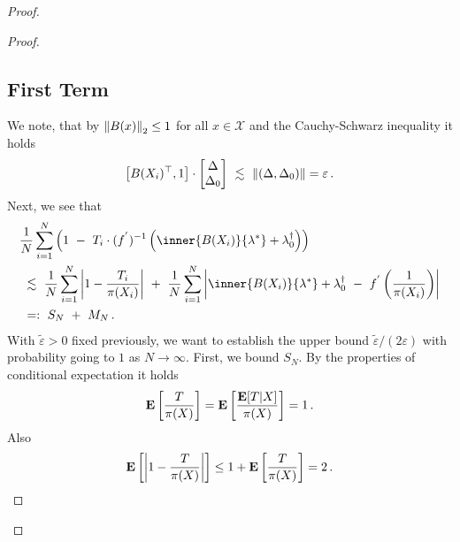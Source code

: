 \begin{proof}
\begin{proof}
\subsection*{First Term}
We note, that by $\left\lVert B(x)\right\rVert_2\le 1$ for all $x\in\mathcal{X}$ and the Cauchy-Schwarz inequality
it holds
\begin{gather}
  \label{c:first:0}
      \left[ 
       B(X_i)^\top,
       1
     \right]
     \cdot
     \begin{bmatrix}
       \Delta\\
       \Delta_0
     \end{bmatrix}
     \ 
     \lesssim
     \ 
     \norm{(\Delta,\Delta_0)}
     =\varepsilon
     \,.
\end{gather}
Next, we see that
\begin{align}
  \label{c:first:1}
  \begin{split}
  &
     \frac{1}{N}
     \sum_{i=1}^{N} 
     \left( 
       1
       \ 
       -
       \ 
     T_i
     \cdot
     (f^{'})^{-1}
     \left( 
       \inner
       {B(X_i)}
       {\lambda^*}
       +
      \lambda^\dagger_0
     \right)
     \right)
     \\
     &
     \ 
     \lesssim
     \ 
     \frac{1}{N}
     \sum_{i=1}^{N} 
     \left|
     1
     -
     \frac{T_i}{\pi(X_i)}
     \right|
      \ 
     +
      \ 
     \frac{1}{N}
     \sum_{i=1}^{N} 
     \left| 
        \inner
       {B(X_i)}
       {\lambda^*}
       +
      \lambda^\dagger_0
      \ 
        -
        \ 
        f^{'}
        \left( 
          \frac{1}{\pi(X_i)}
        \right)
     \right|
     \\
     &
     \ 
     =:
     \ 
     S_N
     \
     +
     \ 
     M_N
     \,.
\end{split}
\end{align}
With $
\tilde{\varepsilon}
>0
$
fixed previously,
we want to
establish the upper bound
$
\tilde{\varepsilon}
/
(2\varepsilon)
$
with probability going to $1$ as $N\to\infty$.
First, we bound $S_N$.
By the properties of conditional expectation it holds
\begin{gather*}
  \mathbf{E}
  \left[ 
    \frac{T}{\pi(X)}
  \right]
  =
  \mathbf{E}
  \left[ 
    \frac{\mathbf{E}[T|X]}{\pi(X)}
  \right]
  =1
  \,.
\end{gather*}
Also
\begin{gather}
  \mathbf{E}
  \left[ 
    \left| 
    1
    -
    \frac{T}{\pi(X)}
    \right|
  \right]
  \le
  1
  +
  \mathbf{E}
  \left[ 
    \frac{T}{\pi(X)}
  \right]
  =
  2
  \,.
\end{gather}

\end{proof}
\end{proof}
